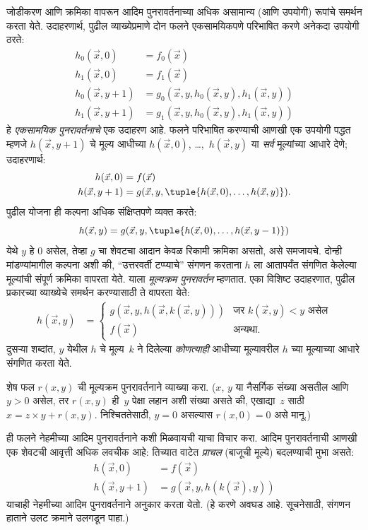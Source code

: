\documentclass[../../../include/open-logic-section]{subfiles}
\begin{document}

जोडीकरण आणि क्रमिका वापरून आदिम पुनरावर्तनाच्या अधिक असामान्य (आणि
उपयोगी) रूपांचे समर्थन करता येते. उदाहरणार्थ, पुढील व्याख्येप्रमाणे दोन
फलने एकसामयिकपणे परिभाषित करणे अनेकदा उपयोगी ठरते:
\begin{align*}
h_0(\vec x, 0) & = f_0(\vec x) \\
h_1(\vec x, 0) & = f_1(\vec x) \\
h_0(\vec x, y+1) & = g_0(\vec x, y, h_0(\vec x, y), h_1(\vec x, y)) \\
h_1(\vec x, y+1) & = g_1(\vec x, y, h_0(\vec x, y), h_1(\vec x, y))
\end{align*}
हे \emph{एकसामयिक पुनरावर्तनाचे} एक उदाहरण आहे. फलने परिभाषित करण्याची
आणखी एक उपयोगी पद्धत म्हणजे $h(\vec x, y+1)$ चे मूल्य आधीच्या
$h(\vec x, 0)$, \dots,~$h(\vec x, y)$ या \emph{सर्व} मूल्यांच्या आधारे
देणे; उदाहरणार्थ:
\begin{align*}
h(\vec x, 0) & = f(\vec x) \\
h(\vec x, y+1) & = g(\vec x, y, \tuple{h(\vec x, 0), \dots, h(\vec x, y)}).
\end{align*}
पुढील योजना ही कल्पना अधिक संक्षिप्तपणे व्यक्त करते:
\[
h(\vec x, y) = g(\vec x, y, \tuple{h(\vec x, 0), \dots, h(\vec x, y-1)})
\]
येथे $y$ हे $0$ असेल, तेव्हा $g$ चा शेवटचा आदान केवळ रिकामी क्रमिका
असतो, असे समजायचे. दोन्ही मांडण्यांमागील कल्पना अशी की, ``उत्तरवर्ती
टप्प्याचे'' संगणन करताना $h$ ला आतापर्यंत संगणित केलेल्या मूल्यांची संपूर्ण
क्रमिका वापरता येते. याला \emph{मूल्यक्रम पुनरावर्तन} म्हणतात. एका विशिष्ट
उदाहरणात, पुढील प्रकारच्या व्याख्येचे समर्थन करण्यासाठी ते वापरता येते:
\begin{align*}
h(\vec x, y) & = \begin{cases}
  g(\vec x, y, h(\vec x, k(\vec x, y))) & \text{जर $k(\vec x, y) < y$ असेल} \\
  f(\vec x) & \text{अन्यथा.}
\end{cases}
\end{align*}
दुसऱ्या शब्दांत, $y$ येथील $h$ चे मूल्य~$k$ ने दिलेल्या \emph{कोणत्याही}
आधीच्या मूल्यावरील $h$ च्या मूल्याच्या आधारे संगणित करता येते.


\begin{prob}
  शेष फल $r(x,y)$ ची मूल्यक्रम पुनरावर्तनाने व्याख्या करा. ($x$, $y$ या
  नैसर्गिक संख्या असतील आणि $y > 0$ असेल, तर $r(x,y)$ ही~$y$ पेक्षा लहान
  अशी संख्या असते की, एखाद्या~$z$ साठी $x = z\times y + r(x,y)$. निश्चिततेसाठी,
  $y=0$ असल्यास $r(x,0) = 0$ असे मानू.)
\end{prob}

ही फलने नेहमीच्या आदिम पुनरावर्तनाने कशी मिळवायची याचा विचार करा. आदिम
पुनरावर्तनाची आणखी एक शेवटची आवृत्ती अधिक लवचीक आहे: तिच्यात वाटेत
\emph{प्राचल} (बाजूची मूल्ये) बदलण्याची मुभा असते:
\begin{align*}
h(\vec x, 0) & = f(\vec x) \\
h(\vec x, y+1) & = g(\vec x, y, h(k(\vec x), y))
\end{align*}
याचाही नेहमीच्या आदिम पुनरावर्तनाने अनुकार करता येतो. (हे करणे अवघड आहे.
सूचनेसाठी, संगणन हाताने उलट क्रमाने उलगडून पाहा.)
\end{document}
